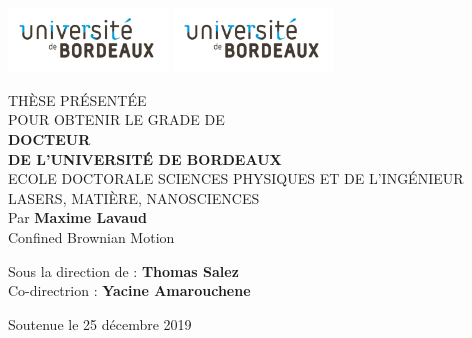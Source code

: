 \begin{titlepage}
\pagestyle{empty}
\includegraphics[scale=1, height=1.7cm]{01_head/images/brdx.pdf}
\hfill
\includegraphics[scale=1, height=1.7cm]{01_head/images/brdx.pdf}
\hfill
\begin{center}
\doublespacing
\begin{Large}

THÈSE PRÉSENTÉE\\ POUR OBTENIR LE GRADE DE \\
{\large \textbf{DOCTEUR\\DE L'UNIVERSITÉ DE BORDEAUX} } \\
\vspace{0.40cm}
ECOLE DOCTORALE SCIENCES PHYSIQUES ET DE L'INGÉNIEUR\\
{\normalsize LASERS, MATIÈRE, NANOSCIENCES} \\
\vspace{0.40cm}
Par \textbf{Maxime Lavaud} \\
\vspace{0.40cm}
{\Large Confined Brownian Motion}
\end{Large}
\vspace{0.40cm}
\begin{normalsize}
\begin{singlespace}
Sous la direction de : \textbf{Thomas Salez}\\
Co-directrion : \textbf{Yacine Amarouchene}
\end{singlespace}
\end{normalsize}
\end{center}

{\large Soutenue le 25 décembre 2019 }\\


\end{titlepage}
